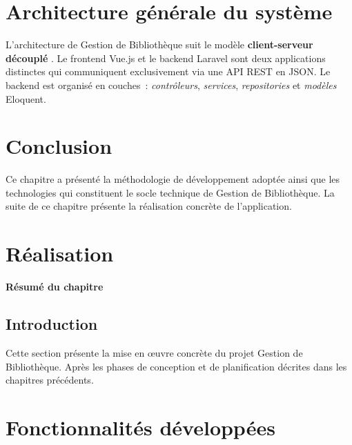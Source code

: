 ﻿\documentclass[12pt,a4paper]{report}
\begin{document}
\section{Architecture générale du système}

L'architecture de Gestion de Bibliothèque suit le modèle \textbf{client-serveur découplé} \cite{restapi}.
Le frontend Vue.js et le backend Laravel sont deux applications distinctes qui communiquent
exclusivement via une API REST en JSON. Le backend est organisé en couches~:
\textit{contrôleurs}, \textit{services}, \textit{repositories} et \textit{modèles} Eloquent.

\section{Conclusion}

Ce chapitre a présenté la méthodologie de développement adoptée ainsi que les
technologies qui constituent le socle technique de Gestion de Bibliothèque. La suite de ce chapitre présente
la réalisation concrète de l'application.

\section{Réalisation}

\begin{center}
    \textbf{Résumé du chapitre}
\end{center}
\begin{center}
\end{center}

\subsection{Introduction}

Cette section présente la mise en œuvre concrète du projet Gestion de Bibliothèque. Après
les phases de conception et de planification décrites dans les chapitres précédents.

\section{Fonctionnalités développées}
\end{document}
